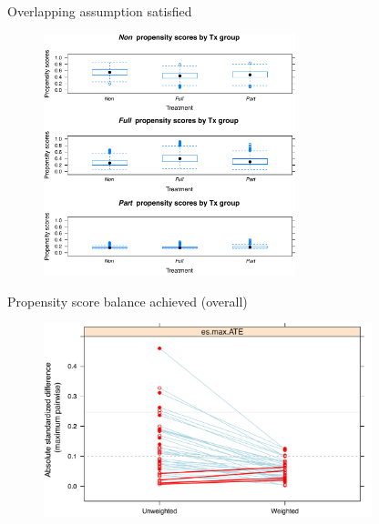 \documentclass[10pt, compress]{beamer}
\begin{document}
\begin{frame}{Overlapping assumption satisfied}

\begin{figure}
\centering

   \includegraphics[width= 0.65\textwidth]{psdiag2.pdf}

\end{figure}
\end{frame}

\begin{frame}{Propensity score balance achieved (overall)}

\begin{figure}
\centering

   \includegraphics[width= 0.85\textwidth]{psdiag3.pdf}

\end{figure}
\end{frame}
\end{document}
